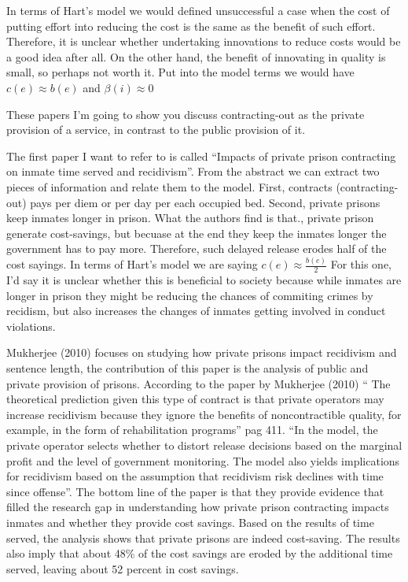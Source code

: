 \documentclass[11pt]{article} %
\begin{document}
In terms of Hart's model we would defined unsuccessful a case when the cost of putting effort into reducing the cost is the same as the benefit of such effort. Therefore, it is unclear whether undertaking innovations to reduce costs would be a good idea after all. On the other hand, the benefit of innovating in quality is small, so perhaps not worth it. Put into the model terms we would have $c(e) \approx b(e)$ and $\beta(i) \approx 0$

These papers I'm going to show you discuss contracting-out as the private provision of a service, in contrast to the public provision of it.  

The first paper I want to refer to is called ``Impacts of private prison contracting on inmate time served and recidivism''. From the abstract we can extract two pieces of information and relate them to the model. First, contracts (contracting-out) pays per diem or per day per each occupied bed. Second, private prisons keep inmates longer in prison. What the authors find is that., private prison generate cost-savings, but becuase at the end they keep the inmates longer the government has to pay more. Therefore, such delayed release erodes half of the cost sayings. In terms of Hart's model we are saying $c(e) \approx \frac{b(e)}{2}$  For this one, I'd say it is unclear whether this is beneficial to society because while inmates are longer in prison they might be reducing the chances of commiting crimes by recidism, but also increases the changes of inmates getting involved in conduct violations.

Mukherjee (2010) focuses on studying how private prisons impact recidivism and sentence length, the contribution of this paper is the analysis of public and private provision of prisons. According to the paper by Mukherjee (2010) `` The theoretical prediction given this type of contract is that private operators may increase recidivism because they ignore the benefits of noncontractible quality, for example, in the form of rehabilitation programs'' pag 411. ``In the model, the private operator selects whether to distort release decisions based on the marginal profit and the level of government monitoring. The model also yields implications for recidivism based on the assumption that recidivism risk declines with time since offense''. The bottom line of the paper is that they provide evidence that filled the research gap in understanding how private prison contracting impacts inmates and whether they provide cost savings. Based on the results of time served, the analysis shows that private prisons are indeed cost-saving. The results also imply that about 48\% of the cost savings are eroded by the additional time served, leaving about 52 percent in cost savings.
\end{document}
